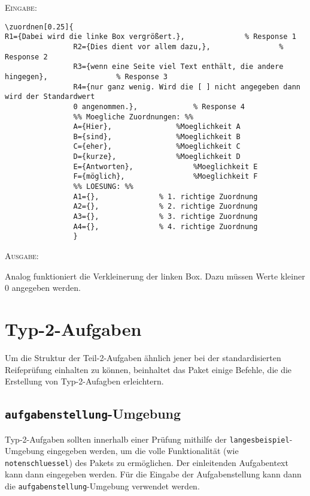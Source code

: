 \documentclass[a4paper,12pt]{article}
\begin{document}
\textsc{Eingabe:}
\begin{small}
\begin{verbatim}
\zuordnen[0.25]{
R1={Dabei wird die linke Box vergrößert.},				% Response 1
				R2={Dies dient vor allem dazu,},				% Response 2
				R3={wenn eine Seite viel Text enthält, die andere hingegen},				% Response 3
				R4={nur ganz wenig. Wird die [ ] nicht angegeben dann wird der Standardwert
				0 angenommen.},				% Response 4
				%% Moegliche Zuordnungen: %%
				A={Hier}, 				%Moeglichkeit A  
				B={sind}, 				%Moeglichkeit B  
				C={eher}, 				%Moeglichkeit C  
				D={kurze}, 				%Moeglichkeit D  
				E={Antworten}, 				%Moeglichkeit E  
				F={möglich}, 				%Moeglichkeit F  
				%% LOESUNG: %%
				A1={},				% 1. richtige Zuordnung
				A2={},				% 2. richtige Zuordnung
				A3={},				% 3. richtige Zuordnung
				A4={},				% 4. richtige Zuordnung
				}
\end{verbatim}



\textsc{Ausgabe:}

\end{small}

Analog funktioniert die Verkleinerung der linken Box. Dazu müssen Werte kleiner 0 angegeben werden.


\section{Typ-2-Aufgaben}
Um die Struktur der Teil-2-Aufgaben ähnlich jener bei der standardisierten Reifeprüfung einhalten zu können, beinhaltet das Paket einige Befehle, die die Erstellung von Typ-2-Aufagben erleichtern.

\subsection{\texttt{aufgabenstellung}-Umgebung}
Typ-2-Aufgaben sollten innerhalb einer Prüfung mithilfe der \texttt{langesbeispiel}-Umgebung eingegeben werden, um die volle Funktionalität (wie \texttt{notenschluessel}) des Pakets zu ermöglichen. Der einleitenden Aufgabentext kann dann eingegeben werden. Für die Eingabe der Aufgabenstellung kann dann die \texttt{aufgabenstellung}-Umgebung verwendet werden.\leer
\end{document}
